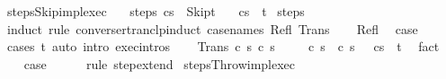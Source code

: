 \begin{isabellebody}
\isamarkupfalse%
%
\endisatagproof
{\isafoldproof}%
%
\isadelimproof
\isanewline
%
\endisadelimproof
\isanewline
{}\isamarkupfalse%
\ steps{\isacharunderscore}Skip{\isacharunderscore}impl{\isacharunderscore}exec{\isacharcolon}\isanewline
\ \ \ steps{\isacharcolon}\ {\isachardoublequoteopen}{\isasymGamma}{\isasymturnstile}{\isacharparenleft}c{\isacharcomma}s{\isacharparenright}\ {\isasymrightarrow}\isactrlsup {\isacharasterisk}\ {\isacharparenleft}Skip{\isacharcomma}t{\isacharparenright}{\isachardoublequoteclose}\isanewline
\ \ \ {\isachardoublequoteopen}{\isasymGamma}{\isasymturnstile}{\isasymlangle}c{\isacharcomma}s{\isasymrangle}\ {\isasymRightarrow}\ t{\isachardoublequoteclose}\isanewline
%
\isadelimproof
%
\endisadelimproof
%
\isatagproof
{}\isamarkupfalse%
\ steps\isanewline
{}\isamarkupfalse%
\ {\isacharparenleft}induct\ rule{\isacharcolon}\ converse{\isacharunderscore}rtranclp{\isacharunderscore}induct{}\ {\isacharbrackleft}case{\isacharunderscore}names\ Refl\ Trans{\isacharbrackright}{\isacharparenright}\isanewline
\ \ \isamarkupfalse%
\ Refl\ \isamarkupfalse%
\ {\isacharquery}case\isanewline
\ \ \ \ \isamarkupfalse%
\ {\isacharparenleft}cases\ t{\isacharparenright}\ {\isacharparenleft}auto\ intro{\isacharcolon}\ exec{\isachardot}intros{\isacharparenright}\isanewline
{}\isamarkupfalse%
\isanewline
\ \ \isamarkupfalse%
\ {\isacharparenleft}Trans\ c\ s\ c{\isacharprime}\ s{\isacharprime}{\isacharparenright}\isanewline
\ \ \isamarkupfalse%
\ {\isachardoublequoteopen}{\isasymGamma}{\isasymturnstile}\ {\isacharparenleft}c{\isacharcomma}\ s{\isacharparenright}\ {\isasymrightarrow}\ {\isacharparenleft}c{\isacharprime}{\isacharcomma}\ s{\isacharprime}{\isacharparenright}{\isachardoublequoteclose}\ \ {\isachardoublequoteopen}{\isasymGamma}{\isasymturnstile}\ {\isasymlangle}c{\isacharprime}{\isacharcomma}s{\isacharprime}{\isasymrangle}\ {\isasymRightarrow}\ t{\isachardoublequoteclose}\ \isamarkupfalse%
\ fact{\isacharplus}\isanewline
\ \ \isamarkupfalse%
\ {\isacharquery}case\isanewline
\ \ \ \ \isamarkupfalse%
\ {\isacharparenleft}rule\ step{\isacharunderscore}extend{\isacharparenright}\isanewline
{}\isamarkupfalse%
%
\endisatagproof
{\isafoldproof}%
%
\isadelimproof
\isanewline
%
\endisadelimproof
\isanewline
{}\isamarkupfalse%
\ steps{\isacharunderscore}Throw{\isacharunderscore}impl{\isacharunderscore}exec{\isacharcolon}\isanewline

\end{isabellebody}
